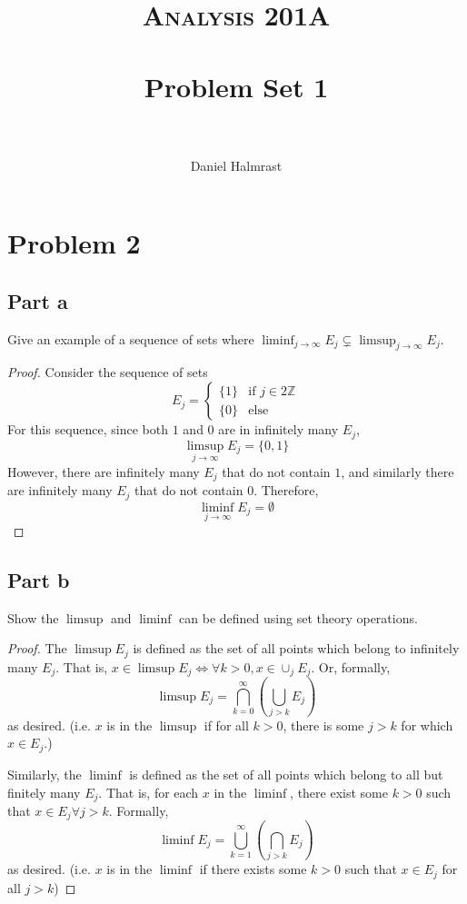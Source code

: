 \documentclass[paper=a4, fontsize=11pt]{scrartcl} %
\title{	
\normalfont \normalsize 
\textsc{Analysis 201A} \\ [25pt] %
\horrule{0.5pt} \\[0.4cm] %
\huge Problem Set 1 \\ %
\horrule{2pt} \\[0.5cm] %
}
\author{Daniel Halmrast} %
\date{} %
\numberwithin{equation}{section} %
\numberwithin{figure}{section} %
\numberwithin{table}{section} %
\begin{document}
\maketitle %


\section*{Problem 2}
\subsection*{Part a}
Give an example of a sequence of sets where $\liminf_{j\to \infty} E_j \subsetneq \limsup_{j\to\infty} E_j$.
\\
\begin{proof}
Consider the sequence of sets
\[
E_j = \begin{cases}
\{1\} &\mbox{if } j \in 2\mathbb{Z}\\
\{0\} &\mbox{else}
\end{cases}
\]
For this sequence, since both $1$ and $0$ are in infinitely many $E_j$, 
\[
\limsup_{j\to\infty} E_j = \{0,1\}
\]
However, there are infinitely many $E_j$ that do not contain $1$, and similarly
there are infinitely many $E_j$ that do not contain $0$. Therefore, 
\[
\liminf_{j\to\infty} E_j = \emptyset
\]
\end{proof}

\subsection*{Part b}
Show the $\limsup$ and $\liminf$ can be defined using set theory operations.
\\
\begin{proof}
The $\limsup E_j$ is defined as the set of all points which belong to infinitely many $E_j$.
That is, $x \in \limsup E_j \iff \forall k>0, x\in \cup_j E_j$. Or, formally,
\[
\limsup E_j = \bigcap_{k=0}^{\infty} (\bigcup_{j>k} E_j)
\]
as desired. (i.e. $x$ is in the $\limsup$ if for all $k>0$, there is some $j>k$ for which $x\in E_j$.)

Similarly, the $\liminf$ is defined as the set of all points which belong to all but finitely many $E_j$.
That is, for each $x$ in the $\liminf$, there exist some $k > 0$ such that $x\in E_j \forall j>k$.
Formally,
\[
\liminf E_j = \bigcup_{k=1}^{\infty} ( \bigcap_{j>k} E_j)
\]
as desired. (i.e. $x$ is in the $\liminf$ if there exists some $k>0$ such that $x\in E_j$ for all $j>k$)
\end{proof}
\end{document}
